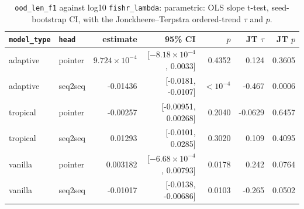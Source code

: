 \documentclass[10pt]{article}
\begin{document}
{\small
\begin{longtable}{llrrrrr}
\caption{\texttt{ood\_len\_f1} against log10 \texttt{fishr\_lambda}: parametric: OLS slope t-test, seed-bootstrap CI, with the Jonckheere--Terpstra ordered-trend $\tau$ and $p$.}\label{tab:trend-ood_len_f1}\\
\toprule
\texttt{model\_type} & \texttt{head} & estimate & 95\% CI & $p$ & JT $\tau$ & JT $p$\\
\midrule
\endhead
adaptive & pointer & $9.724\times10^{-4}$ & [$-8.18\times10^{-4}$, 0.0033] & 0.4352 & 0.124 & 0.3605\\
adaptive & seq2seq & -0.01436 & [-0.0181, -0.0107] & $<10^{-4}$ & -0.467 & 0.0006\\
tropical & pointer & -0.00257 & [-0.00951, 0.00268] & 0.2040 & -0.0629 & 0.6457\\
tropical & seq2seq & 0.01293 & [-0.0101, 0.0285] & 0.3020 & 0.109 & 0.4095\\
vanilla & pointer & 0.003182 & [$-6.68\times10^{-4}$, 0.00793] & 0.0178 & 0.242 & 0.0764\\
vanilla & seq2seq & -0.01017 & [-0.0138, -0.00686] & 0.0103 & -0.265 & 0.0502\\
\bottomrule
\end{longtable}
}
\end{document}
